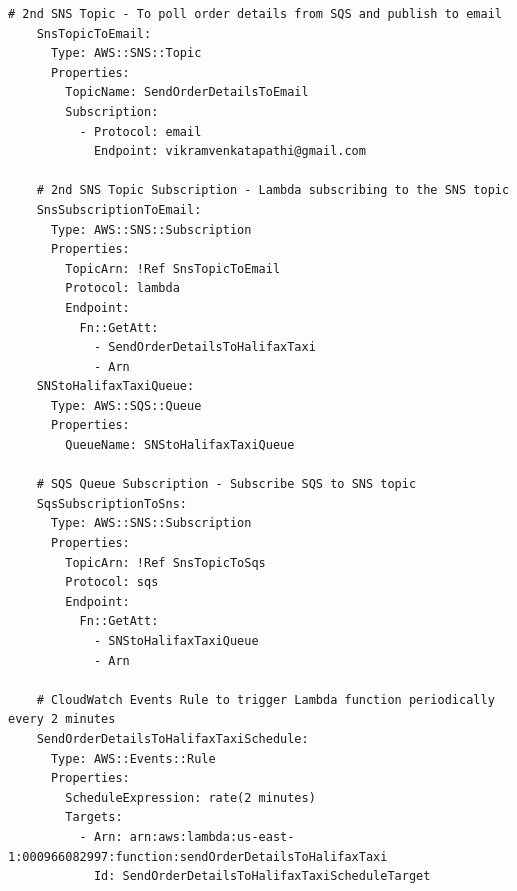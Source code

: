 \begin{enumerate}
\begin{mdframed}[linewidth=1pt]
\begin{lstlisting}[basicstyle=\ttfamily\small, breaklines=true]
    # 2nd SNS Topic - To poll order details from SQS and publish to email
    SnsTopicToEmail:
      Type: AWS::SNS::Topic
      Properties:
        TopicName: SendOrderDetailsToEmail
        Subscription:
          - Protocol: email
            Endpoint: vikramvenkatapathi@gmail.com

    # 2nd SNS Topic Subscription - Lambda subscribing to the SNS topic
    SnsSubscriptionToEmail:
      Type: AWS::SNS::Subscription
      Properties:
        TopicArn: !Ref SnsTopicToEmail
        Protocol: lambda
        Endpoint:
          Fn::GetAtt:
            - SendOrderDetailsToHalifaxTaxi
            - Arn
    SNStoHalifaxTaxiQueue:
      Type: AWS::SQS::Queue
      Properties:
        QueueName: SNStoHalifaxTaxiQueue

    # SQS Queue Subscription - Subscribe SQS to SNS topic
    SqsSubscriptionToSns:
      Type: AWS::SNS::Subscription
      Properties:
        TopicArn: !Ref SnsTopicToSqs
        Protocol: sqs
        Endpoint:
          Fn::GetAtt:
            - SNStoHalifaxTaxiQueue
            - Arn

    # CloudWatch Events Rule to trigger Lambda function periodically every 2 minutes
    SendOrderDetailsToHalifaxTaxiSchedule:
      Type: AWS::Events::Rule
      Properties:
        ScheduleExpression: rate(2 minutes)
        Targets:
          - Arn: arn:aws:lambda:us-east-1:000966082997:function:sendOrderDetailsToHalifaxTaxi
            Id: SendOrderDetailsToHalifaxTaxiScheduleTarget

\end{lstlisting}
\end{mdframed}


\end{enumerate}
